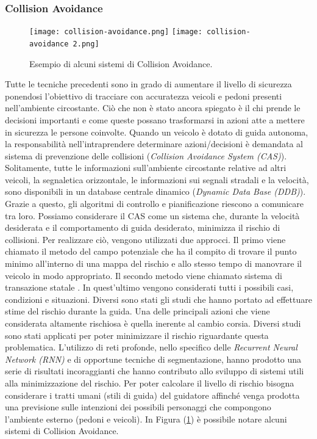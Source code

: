 \subsubsection{Collision Avoidance}
\begin{figure}
    \centering
    \texttt{[image: collision-avoidance.png]}
    \texttt{[image: collision-avoidance 2.png]}
    \centering
    \caption{Esempio di alcuni sistemi di Collision Avoidance.}
    \label{coll-avoid}
\end{figure}
Tutte le tecniche precedenti sono in grado di aumentare il livello di sicurezza 
ponendosi l'obiettivo di tracciare con accuratezza veicoli e pedoni presenti 
nell'ambiente circostante. Ciò che non è stato ancora spiegato è il chi prende 
le decisioni importanti e come queste possano trasformarsi in azioni atte a 
mettere in sicurezza le persone coinvolte. Quando un veicolo è dotato di 
guida autonoma, la responsabilità nell'intraprendere determinare azioni/decisioni 
è demandata al sistema di prevenzione delle collisioni (\emph{Collision 
Avoidance System (CAS)}). Solitamente, tutte le informazioni sull'ambiente 
circostante relative ad altri veicoli, la segnaletica orizzontale, le informazioni 
sui segnali stradali e la velocità, sono disponibili in un database centrale 
dinamico (\emph{Dynamic Data Base (DDB)}). Grazie a questo, gli algoritmi di 
controllo e pianificazione riescono a comunicare tra loro. Possiamo considerare 
il CAS come un sistema che, durante la velocità desiderata e il 
comportamento di guida desiderato, minimizza il rischio di collisioni. Per 
realizzare ciò, vengono utilizzati due approcci. Il primo viene chiamato 
il metodo del campo potenziale \cite{col-avoid} che ha il compito di trovare il punto 
minimo all'interno di una mappa del rischio e allo stesso tempo di manovrare 
il veicolo in modo appropriato. Il secondo metodo viene chiamato sistema di 
transazione statale \cite{col-avoid2}. In quest'ultimo vengono considerati tutti i possibili 
casi, condizioni e situazioni. Diversi sono stati gli studi che hanno portato 
ad effettuare stime del rischio durante la guida. Una delle principali azioni 
che viene considerata altamente rischiosa è quella inerente al cambio corsia. 
Diversi studi \cite{risk} sono stati applicati per poter minimizzare il rischio riguardante 
questa problematica. L'utilizzo di reti profonde, nello specifico delle 
\emph{Recurrent Neural Network (RNN)} e di opportune tecniche di segmentazione, 
hanno prodotto una serie di risultati incoraggianti che hanno contributo 
allo sviluppo di sistemi utili alla minimizzazione del rischio. Per poter 
calcolare il livello di rischio bisogna considerare i tratti umani (stili di guida) 
del guidatore affinché venga prodotta una previsione sulle intenzioni dei 
possibili personaggi che compongono l'ambiente esterno (pedoni e veicoli). 
In Figura (\ref{coll-avoid}) è possibile notare alcuni sistemi di Collision Avoidance.

